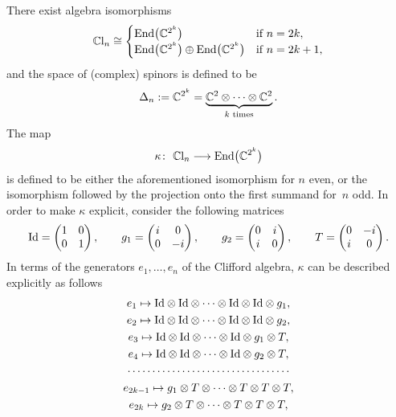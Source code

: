 \documentclass[10pt,a4paper]{amsart}
\newcommand{\End}{{\rm End}}
\numberwithin{equation}{section}
\begin{document}
There exist algebra isomorphisms
\begin{gather}
\mathbb{C}{\rm l}_n\cong
 \begin{cases}
 \End\big(\mathbb{C}^{2^k}\big) & \text{if $n=2k$},\\
 \End\big(\mathbb{C}^{2^k}\big)\oplus\End\big(\mathbb{C}^{2^k}\big) & \text{if $n=2k+1$},
 \end{cases}\label{eq: isomorphisms Clifford algebras}
\end{gather}
and the space of (complex) spinors is def\/ined to be
\begin{gather*}\Delta_n:=\mathbb{C}^{2^k}=\underbrace{\mathbb{C}^2\otimes \dots \otimes \mathbb{C}^2}_{k\,\,{\rm times}}.\end{gather*}
The map
\begin{gather*}\kappa\colon \ \mathbb{C}{\rm l}_n \longrightarrow \End\big(\mathbb{C}^{2^k}\big)\end{gather*}
is def\/ined to be either the aforementioned isomorphism for $n$ even, or the isomorphism followed by the projection onto the f\/irst summand for~$n$ odd. In order to make $\kappa$ explicit, consider the following matrices
\begin{gather*}{\rm Id} = \left(\begin{matrix}
1 & 0\\
0 & 1
 \end{matrix}\right),\qquad
g_1 = \left(\begin{matrix}
i & 0\\
0 & -i
 \end{matrix}\right),\qquad
g_2 = \left(\begin{matrix}
0 & i\\
i & 0
 \end{matrix}\right),\qquad
T = \left(\begin{matrix}
0 & -i\\
i & 0
 \end{matrix}\right).
\end{gather*}
In terms of the generators $e_1, \dots, e_n$ of the Clif\/ford algebra, $\kappa$ can be described explicitly as follows
\begin{gather}
e_1 \mapsto {\rm Id}\otimes {\rm Id}\otimes \dots\otimes {\rm Id}\otimes {\rm Id}\otimes g_1,\nonumber\\
e_2 \mapsto {\rm Id}\otimes {\rm Id}\otimes \dots\otimes {\rm Id}\otimes {\rm Id}\otimes g_2,\nonumber\\
e_3 \mapsto {\rm Id}\otimes {\rm Id}\otimes \dots\otimes {\rm Id}\otimes g_1\otimes T,\nonumber\\
e_4 \mapsto {\rm Id}\otimes {\rm Id}\otimes \dots\otimes {\rm Id}\otimes g_2\otimes T,\label{eq: explicit isomorphisms Clifford algebras}\\
 \cdots\cdots\cdots\cdots\cdots\cdots\cdots\cdots\cdots\cdots\cdots\nonumber\\
e_{2k-1} \mapsto g_1\otimes T\otimes \dots\otimes T\otimes T\otimes T,\nonumber\\
e_{2k} \mapsto g_2\otimes T\otimes\dots\otimes T\otimes T\otimes T,\nonumber
\end{gather}
\end{document}
